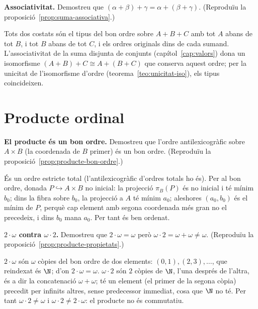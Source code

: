 \begin{exercici}
\textbf{Associativitat.} Demostreu que \((\alpha+\beta)+\gamma=\alpha+(\beta+\gamma)\). (Reproduïu la proposició~\ref{prop:suma-associativa}.)
\end{exercici}
\begin{solucio}
Tots dos costats són el tipus del bon ordre sobre \(A+B+C\) amb tot \(A\) abans de tot \(B\), i tot \(B\) abans de tot \(C\), i els ordres originals dins de cada sumand. L'associativitat de la suma disjunta de conjunts (capítol~\ref{cap:valors}) dona un isomorfisme \((A+B)+C\cong A+(B+C)\) que conserva aquest ordre; per la unicitat de l'isomorfisme d'ordre (teorema~\ref{teo:unicitat-iso}), els tipus coincideixen.
\end{solucio}

\section{Producte ordinal}\label{prac:producte-ordinal}

\begin{exercici}
\textbf{El producte és un bon ordre.} Demostreu que l'ordre antilexicogràfic sobre \(A\times B\) (la coordenada de \(B\) primer) és un bon ordre. (Reproduïu la proposició~\ref{prop:producte-bon-ordre}.)
\end{exercici}
\begin{solucio}
És un ordre estricte total (l'antilexicogràfic d'ordres totals ho és). Per al bon ordre, donada \(P\hookrightarrow A\times B\) no inicial: la projecció \(\pi_B(P)\) és no inicial i té mínim \(b_0\); dins la fibra sobre \(b_0\), la projecció a \(A\) té mínim \(a_0\); aleshores \((a_0,b_0)\) és el mínim de \(P\), perquè cap element amb segona coordenada més gran no el precedeix, i dins \(b_0\) mana \(a_0\). Per tant és ben ordenat.
\end{solucio}

\begin{exercici}
\textbf{\(2\cdot\omega\) contra \(\omega\cdot2\).} Demostreu que \(2\cdot\omega=\omega\) però \(\omega\cdot2=\omega+\omega\neq\omega\). (Reproduïu la proposició~\ref{prop:producte-propietats}.)
\end{exercici}
\begin{solucio}
\(2\cdot\omega\) són \(\omega\) còpies del bon ordre de dos elements: \((0,1),(2,3),\dots\), que reindexat és \(\N\); d'on \(2\cdot\omega=\omega\). \(\omega\cdot2\) són \(2\) còpies de \(\N\), l'una després de l'altra, és a dir la concatenació \(\omega+\omega\); té un element (el primer de la segona còpia) precedit per infinits altres, sense predecessor immediat, cosa que \(\N\) no té. Per tant \(\omega\cdot2\neq\omega\) i \(\omega\cdot2\neq2\cdot\omega\): el producte no és commutatiu.
\end{solucio}

